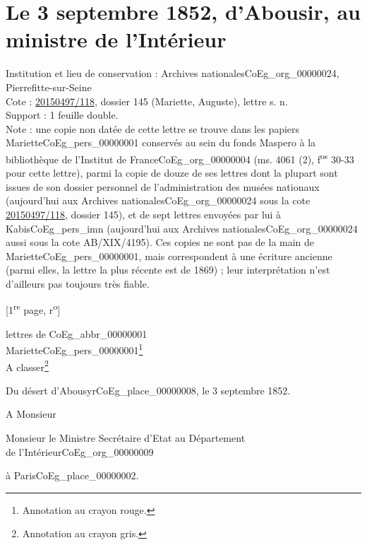 \documentclass{book}
\begin{document}
\section*{Le 3 septembre 1852, d'Abousir, au ministre de l'Intérieur} \label{CoEg_Mariette_1852-09-03} 
{\footnotesize \noindent Institution et lieu de conservation : Archives nationales\gls{CoEg_org_00000024}, Pierrefitte-sur-Seine\\
Cote : \hyperref[CoEg_Mariette_ms_001]{20150497/118}, dossier 145 (Mariette, Auguste), lettre s. n.\\
Support : 1 feuille double.\\
Note : une copie non datée de cette lettre se trouve dans les papiers Mariette\gls{CoEg_pers_00000001} conservés au sein du fonds Maspero à la bibliothèque de l'Institut de France\gls{CoEg_org_00000004} (ms. 4061 (2), f\textsuperscript{os} 30-33 pour cette lettre), parmi la copie de douze de ses lettres dont la plupart sont issues de son dossier personnel de l'administration des musées nationaux (aujourd'hui aux Archives nationales\gls{CoEg_org_00000024} sous la cote \hyperref[CoEg_Mariette_ms_001]{20150497/118}, dossier 145), et de sept lettres envoyées par lui à Kabis\gls{CoEg_pers_imn} (aujourd'hui aux Archives nationales\gls{CoEg_org_00000024} aussi sous la cote AB/XIX/4195). Ces copies ne sont pas de la main de Mariette\gls{CoEg_pers_00000001}, mais correspondent à une écriture ancienne (parmi elles, la lettre la plus récente est de 1869) ; leur interprétation n'est d'ailleurs pas toujours très fiable.
\begin{center} {[1\textsuperscript{re} page, r\textsuperscript{o}]}\end{center}}
\noindent lettres de \gls{CoEg_abbr_00000001}\\
Mariette\gls{CoEg_pers_00000001}\footnote{Annotation au crayon rouge.}\\

\noindent A classer\footnote{Annotation au crayon gris.}\\
\begin{flushright} Du désert d’Abousyr\gls{CoEg_place_00000008}, le 3 septembre 1852.\end{flushright}
\indent A Monsieur\\
\begin{center}Monsieur le Ministre Secrétaire d’Etat au Département\\
de l’Intérieur\gls{CoEg_org_00000009}\end{center}
\begin{flushright}à Paris\gls{CoEg_place_00000002}.\end{flushright}
\end{document}
